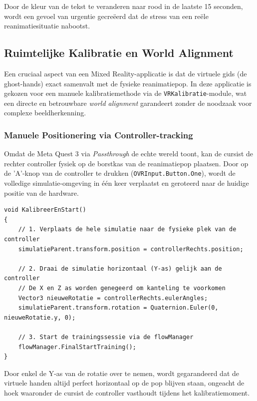 Door de kleur van de tekst te veranderen naar rood in de laatste 15 seconden, wordt een gevoel van urgentie gecreëerd dat de 
stress van een reële reanimatiesituatie nabootst.

\subsection{Ruimtelijke Kalibratie en World Alignment}
Een cruciaal aspect van een Mixed Reality-applicatie is dat de virtuele gids (de ghost-hands) exact samenvalt met de fysieke reanimatiepop. In deze applicatie is gekozen voor een manuele kalibratiemethode via de \texttt{VRKalibratie}-module, wat een directe en betrouwbare \textit{world alignment} garandeert zonder de noodzaak voor complexe beeldherkenning.

\subsubsection{Manuele Positionering via Controller-tracking}
Omdat de Meta Quest 3 via \textit{Passthrough} de echte wereld toont, kan de cursist de rechter controller fysiek op de borstkas van de reanimatiepop plaatsen. Door op de 'A'-knop van de controller te drukken (\texttt{OVRInput.Button.One}), wordt de volledige simulatie-omgeving in één keer verplaatst en geroteerd naar de huidige positie van de hardware.

\begin{listing}[htbp]
\begin{verbatim}
void KalibreerEnStart()
{
    // 1. Verplaats de hele simulatie naar de fysieke plek van de controller
    simulatieParent.transform.position = controllerRechts.position;

    // 2. Draai de simulatie horizontaal (Y-as) gelijk aan de controller
    // De X en Z as worden genegeerd om kanteling te voorkomen
    Vector3 nieuweRotatie = controllerRechts.eulerAngles;
    simulatieParent.transform.rotation = Quaternion.Euler(0, nieuweRotatie.y, 0);

    // 3. Start de trainingssessie via de flowManager
    flowManager.FinalStartTraining();
}
\end{verbatim}
\caption{Manuele ruimtelijke kalibratie en world alignment op basis van controller-tracking.}
\label{lst:spatial_calibration}
\end{listing}

Door enkel de Y-as van de rotatie over te nemen, wordt gegarandeerd dat de virtuele handen altijd perfect horizontaal op de pop blijven staan, 
ongeacht de hoek waaronder de cursist de controller vasthoudt tijdens het kalibratiemoment.

